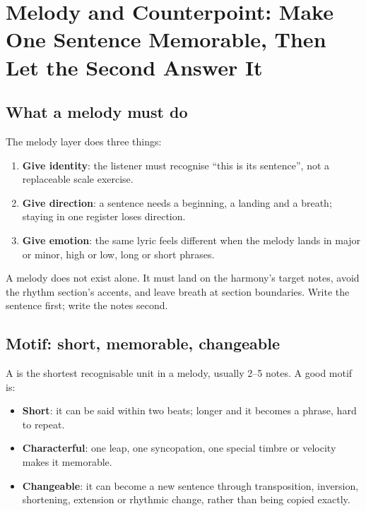 \chapter{Melody and Counterpoint: Make One Sentence Memorable, Then Let the Second Answer It}
\label{ch:melody}


\section{What a melody must do}
\label{sec:melody-job}

The melody layer does three things:

\begin{enumerate}
\item \textbf{Give identity}: the listener must recognise ``this is its sentence'', not a replaceable scale exercise.
\item \textbf{Give direction}: a sentence needs a beginning, a landing and a breath; staying in one register loses direction.
\item \textbf{Give emotion}: the same lyric feels different when the melody lands in major or minor, high or low, long or short phrases.
\end{enumerate}

A melody does not exist alone. It must land on the harmony's target notes, avoid the rhythm section's accents, and leave breath at section boundaries. Write the sentence first; write the notes second.

\section{Motif: short, memorable, changeable}
\label{sec:motif}

A  is the shortest recognisable unit in a melody, usually 2--5 notes. A good motif is:

\begin{itemize}
\item \textbf{Short}: it can be said within two beats; longer and it becomes a phrase, hard to repeat.
\item \textbf{Characterful}: one leap, one syncopation, one special timbre or velocity makes it memorable.
\item \textbf{Changeable}: it can become a new sentence through transposition, inversion, shortening, extension or rhythmic change, rather than being copied exactly.
\end{itemize}

